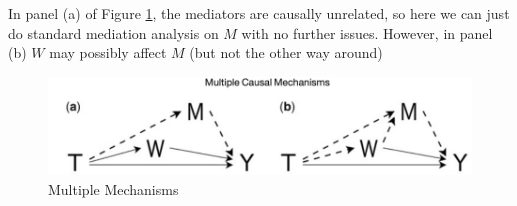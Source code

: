 \documentclass{article}
\begin{document}
	In panel (a) of Figure \ref{fig:causal_diags}, the mediators are causally unrelated, so here we can just do standard mediation analysis on $M$ with no further issues. However, in panel (b) $W$ may possibly affect $M$ (but not the other way around)

	\begin{figure}[H]
		\caption{Multiple Mechanisms}
		\centering
		\label{fig:causal_diags}
		\includegraphics[width=\linewidth]{multiple_mechanisms}
	\end{figure}
	
\end{document}
